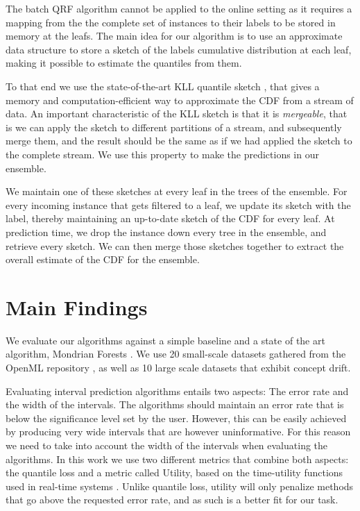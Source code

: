 The batch QRF algorithm cannot be applied to the online setting as it requires
a mapping from the the complete set of instances to their labels to be stored
in memory at the leafs. The main idea for our algorithm is to use an approximate data
structure to store a sketch of the labels cumulative distribution at each leaf,
making it possible to estimate the quantiles from them.

To that end we use the state-of-the-art KLL quantile sketch \cite{karnin2016kll},
that gives a memory and computation-efficient way to approximate the CDF from
a stream of data. An important characteristic of the KLL sketch is that it is
\emph{mergeable}, that is we can apply the sketch to different partitions of
a stream, and subsequently merge them, and the result should be the same
as if we had applied the sketch to the complete stream. We use this property
to make the predictions in our ensemble.

We maintain  one of these sketches at every leaf in the trees of the ensemble.
For every incoming instance that gets filtered to a leaf, we update its sketch
with the label, thereby maintaining an up-to-date sketch of the CDF for every
leaf. At prediction time, we drop the instance
down every tree in the ensemble, and retrieve every sketch.
We can then merge those sketches together to extract the overall estimate
of the CDF for the ensemble.

\section{Main Findings}
\label{sec:uncertain-trees-results}

We evaluate our algorithms against a simple baseline and a state of the art
algorithm, Mondrian Forests \cite{mondrian-forests-original}. We use 20 small-scale
datasets gathered from the OpenML repository \cite{vanschoren2013openml}, as well
as 10 large scale datasets that exhibit concept drift.

Evaluating interval prediction algorithms entails two aspects: The error rate
and the width of the intervals. The algorithms should maintain an error rate
that is below the significance level set by the user. However, this can be
easily achieved by producing very wide intervals that are however uninformative.
For this reason we need to take into account the width of  the intervals when
evaluating the algorithms. In this work we use two different metrics that
combine both aspects: the quantile loss \cite{koenker2005qr} and a metric
called Utility,
based on the time-utility functions used in real-time systems \cite{tuf2005}.
Unlike quantile loss, utility will only penalize methods that go above
the requested error rate, and as such is a better fit for our task.

